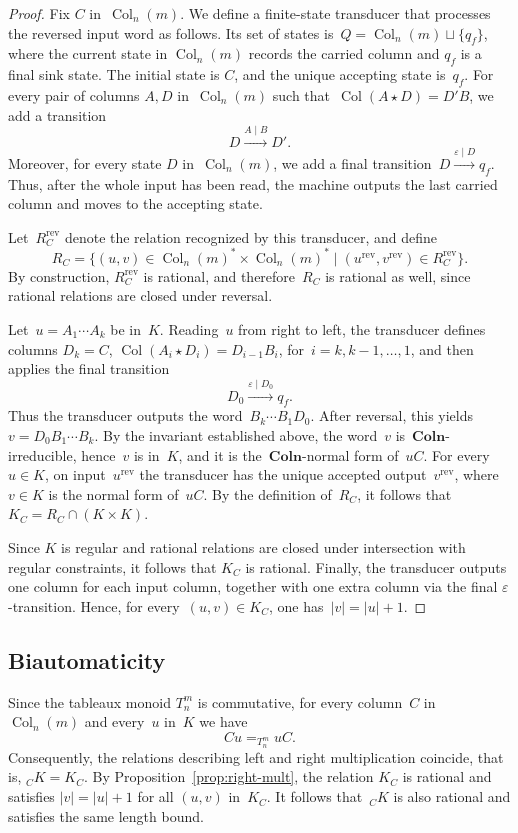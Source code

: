 \documentclass[a4paper, twoside, 11pt, english]{article}
\theoremstyle{plain}
\theoremstyle{definition}
\DeclareMathOperator{\col}{Col}
\newcommand{\Colo}{\mathbf{Coln}}
\begin{document}
\begin{proof}
Fix $C$ in~$\col_n(m)$.
We define a finite-state transducer that processes the reversed
input word as follows.
Its set of states is~$Q=\col_n(m)\sqcup\{q_f\}$, where the current state in $\col_n(m)$ records the carried column and $q_f$
is a final sink state.
The initial state is $C$, and the unique accepting state is~$q_f$.
For every pair of columns $A,D$ in~$\col_n(m)$ such that~$\col(A\star D)=D'B$,
we add a transition
\[
D \xrightarrow{A\mid B} D'.
\]
Moreover, for every state $D$ in~$\col_n(m)$, we add a final transition~$D \xrightarrow{\varepsilon\mid D} q_f$.
Thus, after the whole input has been read, the machine outputs the last carried
column and moves to the accepting state.

Let~$R_C^{\mathrm{rev}}$ denote the relation recognized by this transducer, and define
\[
R_C
=
\{(u,v)\in \col_n(m)^*\times \col_n(m)^*
\mid
(u^{\mathrm{rev}},v^{\mathrm{rev}})\in R_C^{\mathrm{rev}}\}.
\]
By construction, $R_C^{\mathrm{rev}}$ is rational, and therefore~$R_C$ is rational as well, since rational relations are closed under reversal.

Let~$u=A_1\cdots A_k$ be in~$K$.
Reading~$u$ from right to left, the transducer defines columns
$D_k=C$, $\col(A_i\star D_i)=D_{i-1}B_i$, for~$i=k,k-1,\dots,1$,
and then applies the final transition
\[
D_0 \xrightarrow{\varepsilon\mid D_0} q_f.
\]
Thus the transducer outputs the word~$B_k\cdots B_1D_0$.
After reversal, this yields~$v=D_0B_1\cdots B_k$.
By the invariant established above, the word~$v$ is~$\Colo$-irreducible, hence~$v$ is in~$K$, and it is the~$\Colo$-normal form of~$uC$.
For every~$u\in K$, on input~$u^{\mathrm{rev}}$ the transducer
has the unique accepted output~$v^{\mathrm{rev}}$, where~$v\in K$
is the normal form of~$uC$.
By the definition of~$R_C$, it follows that~$K_C=R_C\cap(K\times K)$.

Since $K$ is regular and rational relations are closed under intersection with regular constraints, it follows that $K_C$ is rational.
Finally, the transducer outputs one column for each input column, together with one extra column via the final $\varepsilon$-transition.
Hence, for every~$(u,v)\in K_C$, one has~$|v|=|u|+1$.
\end{proof}

\subsection{Biautomaticity}
Since the tableaux monoid $T_n^m$ is commutative, for every column~$C$ in~$\col_n(m)$ and every~$u$ in~$K$ we have
\[
Cu =_{T_n^m} uC.
\]
Consequently, the relations describing left and right multiplication
coincide, that is, ${}_C K = K_C$.
By Proposition~\ref{prop:right-mult}, the relation $K_C$ is rational and
satisfies $|v|=|u|+1$ for all $(u,v)$ in~$K_C$.
It follows that~${}_C K$ is also rational and satisfies the same
length bound.
\end{document}
